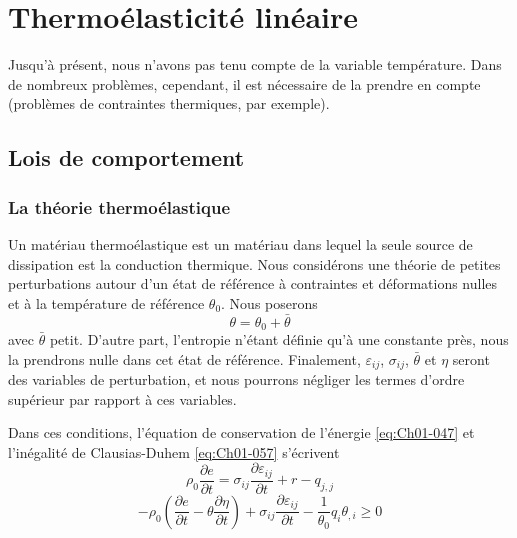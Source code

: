 \chapter{Thermoélasticité linéaire}\label{chap:Ch11}
Jusqu'à présent, nous n'avons pas tenu compte de la variable température. Dans de nombreux problèmes, cependant, il est nécessaire de la prendre en compte (problèmes de contraintes thermiques, par exemple). 
\section{Lois de comportement}\label{sec:Ch11-1}
\subsection{La théorie thermoélastique}\label{ssec:Ch11-1.1}
Un matériau thermoélastique est un matériau dans lequel la seule source de dissipation est la conduction thermique.
Nous considérons une théorie de petites perturbations autour d'un état de référence à contraintes et déformations nulles et à la température de référence $\theta_0$.
Nous poserons 
\begin{equation}
    \theta=\theta_0 + \bar{\theta}
    \label{eq:Ch11-001}
\end{equation}
avec $ \bar{\theta}$ petit.
D'autre part, l'entropie n'étant définie qu'à une constante près, nous la prendrons nulle dans cet état de référence.
Finalement, $ \varepsilon_{ij}$, $\sigma_{ij}$, $\bar{\theta}$ et $\eta$ seront des variables de perturbation, et nous pourrons négliger les termes d'ordre supérieur par rapport à ces variables. 

Dans ces conditions, l'équation de conservation de l'énergie \eqref{eq:Ch01-047} et l'inégalité de Clausias-Duhem \eqref{eq:Ch01-057} s'écrivent 
\begin{equation}
    \rho_0 \frac{\partial e}{\partial t} = \sigma_{ij} \frac{\partial \varepsilon_{ij}}{\partial t} + r - q_{j,j}
    \label{eq:Ch11-002}
\end{equation}
\begin{equation}
    -\rho_0 \left(\frac{\partial e}{\partial t} - \theta\frac{\partial \eta}{\partial t}\right) + \sigma_{ij} \frac{\partial \varepsilon_{ij}}{\partial t} - \frac{1}{\theta_0} q_i \theta_{,i} \geq 0
    \label{eq:Ch11-003}
\end{equation}

